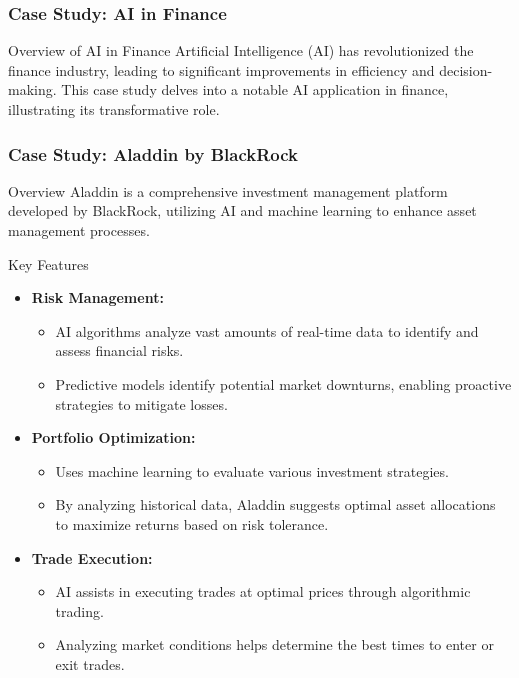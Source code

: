 \documentclass{beamer}
\begin{document}
\begin{frame}[fragile]
    \frametitle{Case Study: AI in Finance}
    \begin{block}{Overview of AI in Finance}
        Artificial Intelligence (AI) has revolutionized the finance industry, leading to significant improvements in efficiency and decision-making. This case study delves into a notable AI application in finance, illustrating its transformative role.
    \end{block}
\end{frame}

\begin{frame}[fragile]
    \frametitle{Case Study: Aladdin by BlackRock}
    \begin{block}{Overview}
        Aladdin is a comprehensive investment management platform developed by BlackRock, utilizing AI and machine learning to enhance asset management processes.
    \end{block}

    \begin{block}{Key Features}
        \begin{itemize}
            \item \textbf{Risk Management:} 
                \begin{itemize}
                    \item AI algorithms analyze vast amounts of real-time data to identify and assess financial risks.
                    \item Predictive models identify potential market downturns, enabling proactive strategies to mitigate losses.
                \end{itemize}

            \item \textbf{Portfolio Optimization:}
                \begin{itemize}
                    \item Uses machine learning to evaluate various investment strategies.
                    \item By analyzing historical data, Aladdin suggests optimal asset allocations to maximize returns based on risk tolerance.
                \end{itemize}

            \item \textbf{Trade Execution:}
                \begin{itemize}
                    \item AI assists in executing trades at optimal prices through algorithmic trading.
                    \item Analyzing market conditions helps determine the best times to enter or exit trades.
                \end{itemize}
        \end{itemize}
    \end{block}
\end{frame}
\end{document}
